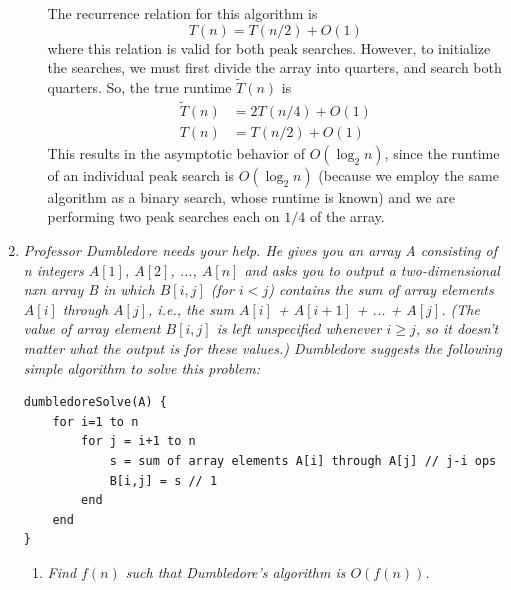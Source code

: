 \documentclass[12pt]{article}
\begin{document}
\begin{enumerate}
\begin{enumerate}
    The recurrence relation for this algorithm is
    \[
    T(n) = T(n/2) + O(1)
    \]
    where this relation is valid for both peak searches. However, to initialize the searches, we must first divide the array into quarters, and search both quarters. So, the true runtime $\tilde{T}(n)$ is 
    \begin{align*}
        \tilde{T}(n) &= 2T(n/4) + O(1)\\
        T(n) &= T(n/2) + O(1)
    \end{align*}
    This results in the asymptotic behavior of $O(\log_2 n)$, since the runtime of an individual peak search is $O(\log_2 n)$ (because we employ the same algorithm as a binary search, whose runtime is known) and we are performing 
two peak searches each on $1/4$ of the array.
    
    \end{enumerate}

    \newpage
    \item \textit{Professor Dumbledore needs your help. He gives you an array A consisting of n integers $A[1]$, $A[2]$, ..., $A[n]$ and asks you to output a two-dimensional nxn array B in which $B[i, j]$ (for $i < j$) contains the 
sum of array elements $A[i]$ through $A[j]$, i.e., the sum $A[i]$ + $A[i + 1]$ + ... + $A[j]$. (The value of array element $B[i, j]$ is left unspecified whenever $i \geq j$, so it doesn't matter what the output is for these 
values.) Dumbledore suggests the following simple algorithm to solve this problem: }
\begin{verbatim}
dumbledoreSolve(A) {
    for i=1 to n
        for j = i+1 to n
            s = sum of array elements A[i] through A[j] // j-i ops
            B[i,j] = s // 1
        end
    end
}    
\end{verbatim}

    \begin{enumerate}
    \item \textit{Find $f(n)$ such that Dumbledore's algorithm is $O(f(n))$.}
    

\end{enumerate}
\end{enumerate}
\end{document}
